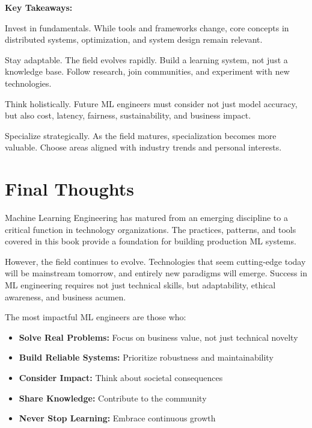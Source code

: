 \textbf{Key Takeaways:}

\begin{bestpractice}
Invest in fundamentals. While tools and frameworks change, core concepts in distributed systems, optimization, and system design remain relevant.
\end{bestpractice}

\begin{bestpractice}
Stay adaptable. The field evolves rapidly. Build a learning system, not just a knowledge base. Follow research, join communities, and experiment with new technologies.
\end{bestpractice}

\begin{bestpractice}
Think holistically. Future ML engineers must consider not just model accuracy, but also cost, latency, fairness, sustainability, and business impact.
\end{bestpractice}

\begin{bestpractice}
Specialize strategically. As the field matures, specialization becomes more valuable. Choose areas aligned with industry trends and personal interests.
\end{bestpractice}

\section{Final Thoughts}

Machine Learning Engineering has matured from an emerging discipline to a critical function in technology organizations. The practices, patterns, and tools covered in this book provide a foundation for building production ML systems.

However, the field continues to evolve. Technologies that seem cutting-edge today will be mainstream tomorrow, and entirely new paradigms will emerge. Success in ML engineering requires not just technical skills, but adaptability, ethical awareness, and business acumen.

The most impactful ML engineers are those who:

\begin{itemize}
    \item \textbf{Solve Real Problems:} Focus on business value, not just technical novelty
    \item \textbf{Build Reliable Systems:} Prioritize robustness and maintainability
    \item \textbf{Consider Impact:} Think about societal consequences
    \item \textbf{Share Knowledge:} Contribute to the community
    \item \textbf{Never Stop Learning:} Embrace continuous growth
\end{itemize}

